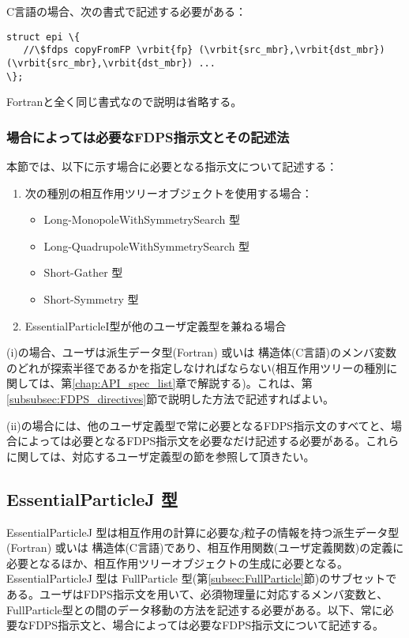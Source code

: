 C言語の場合、次の書式で記述する必要がある：
\begin{screen}
\begin{Verbatim}[commandchars=\\\{\}]
struct epi \{
   //\$fdps copyFromFP \vrbit{fp} (\vrbit{src_mbr},\vrbit{dst_mbr}) (\vrbit{src_mbr},\vrbit{dst_mbr}) ...
\};
\end{Verbatim}
\end{screen}
Fortranと全く同じ書式なので説明は省略する。


\subsubsection{場合によっては必要なFDPS指示文とその記述法}
\label{sec:EPI:FDPS_directives_required_in_specific_cases}
本節では、以下に示す場合に必要となる指示文について記述する：
\begin{enumerate}[leftmargin=*,itemsep=-1ex,label=(\roman*)]
\item 次の種別の相互作用ツリーオブジェクトを使用する場合：
\begin{itemize}
\item Long-MonopoleWithSymmetrySearch 型
\item Long-QuadrupoleWithSymmetrySearch 型
\item Short-Gather 型
\item Short-Symmetry 型
\end{itemize}
\item EssentialParticleI型が他のユーザ定義型を兼ねる場合
\end{enumerate}

(i)の場合、ユーザは派生データ型(Fortran) 或いは 構造体(C言語)のメンバ変数のどれが探索半径であるかを指定しなければならない(相互作用ツリーの種別に関しては、第\ref{chap:API_spec_list}章で解説する)。これは、第\ref{subsubsec:FDPS_directives}節で説明した方法で記述すればよい。

(ii)の場合には、他のユーザ定義型で常に必要となるFDPS指示文のすべてと、場合によっては必要となるFDPS指示文を必要なだけ記述する必要がある。これらに関しては、対応するユーザ定義型の節を参照して頂きたい。



\subsection{EssentialParticleJ 型}
\label{subsec:EssentialParticleJ}
EssentialParticleJ 型は相互作用の計算に必要な$j$粒子の情報を持つ派生データ型(Fortran) 或いは 構造体(C言語)であり、相互作用関数(ユーザ定義関数)の定義に必要となるほか、相互作用ツリーオブジェクトの生成に必要となる。EssentialParticleJ 型は FullParticle 型(第\ref{subsec:FullParticle}節)のサブセットである。ユーザはFDPS指示文を用いて、必須物理量に対応するメンバ変数と、FullParticle型との間のデータ移動の方法を記述する必要がある。以下、常に必要なFDPS指示文と、場合によっては必要なFDPS指示文について記述する。

